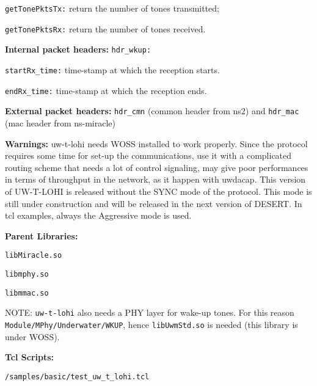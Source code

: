 \begin{description}
\begin{description}
		  \item {\tt getTonePktsTx:} return the number of tones transmitted;
		  \item {\tt getTonePktsRx:} return the number of tones received.
 	\end{description}
   \item {\bf Internal packet headers: }  {\tt hdr\_wkup:}
   	\begin{description}
		\item {\tt startRx\_time:} time-stamp at which the reception starts.
		\item {\tt endRx\_time:} time-stamp at which the reception ends.
	\end{description}
   \item {\bf External packet headers: }  {\tt hdr\_cmn} (common header from ns2) and  {\tt hdr\_mac} (mac header from ns-miracle) 
   \item {\bf Warnings: } uw-t-lohi needs WOSS installed to work properly. Since the protocol requires some time for set-up the communications, use it with a complicated routing scheme that needs a lot of control signaling, may give poor performances in terms of throughput in the network, as it happen with uwdacap.
			  This version of UW-T-LOHI is released without the SYNC mode of the protocol. This mode is still under construction and will be released in the next version of DESERT. In tcl examples, always the Aggressive mode is used.
   \item {\bf Parent Libraries:}
         \begin{description}
         \item {\tt libMiracle.so}
	      \item {\tt libmphy.so} 
	      \item {\tt libmmac.so}
        \end{description}
          NOTE: {\tt uw-t-lohi} also needs a PHY layer for wake-up tones. For this reason {\tt Module/MPhy/Underwater/WKUP}, hence {\tt libUwmStd.so} is needed (this library is under WOSS). 
   \item {\bf Tcl Scripts:} 
    \begin{description}
      \item {\tt /samples/basic/test\_uw\_t\_lohi.tcl}
    \end{description}
\end{description}




